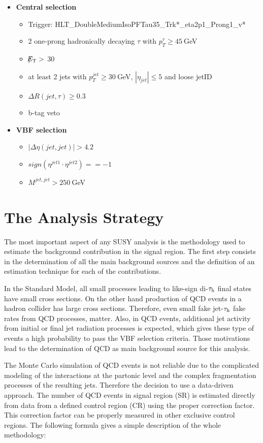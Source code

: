 \begin{itemize}
	\item \textbf{Central selection}
	\begin{itemize}
		\item Trigger: HLT\_DoubleMediumIsoPFTau35\_Trk*\_eta2p1\_Prong1\_v*
		\item 2 one-prong hadronically decaying $\tau$ with $p_{T}^{\tau}\geq45~$GeV 
		\item $\slash\mkern-12mu{E}_{\text{T}} > $ 30
		\item at least 2 jets with $p_{T}^{jet}\geq30~$GeV, $|\eta_{jet}|\leq5$ and loose jetID
		\item $\Delta R(jet,\tau)\geq0.3$
		\item b-tag veto
	\end{itemize}
	\item \textbf{VBF selection}
	\begin{itemize}
		\item $|\Delta\eta(jet,jet)| > 4.2$
		\item $sign(\eta^{jet 1}\cdot\eta^{jet 2})==-1$
		\item $M^{jet,jet}>250~$GeV
	\end{itemize}
\end{itemize}

\section{The Analysis Strategy}

The most important aspect of any SUSY analysis is the methodology used to estimate the background contribution in the signal region. The first step consists in the determination of all the main background sources and the definition of an estimation technique for each of the contributions. 

In the Standard Model, all small processes leading to like-sign di-$\tau_{\text{h}}$ final states have small cross sections. On the other hand production of QCD events in a hadron collider has large cross sections. Therefore, even small fake jet-$\tau_{\text{h}}$ fake rates from QCD processes, matter. Also, in QCD events, additional jet activity from initial or final jet radiation processes is expected, which gives these type of events a high probability to pass the VBF selection criteria. Those motivations lead to the determination of QCD as main background source for this analysis. 

The Monte Carlo simulation of QCD events is not reliable due to the complicated modeling of the interactions at the partonic level and the complex fragmentation processes of the resulting jets. Therefore the decision to use a data-driven approach. The number of QCD events in signal region (SR) is estimated directly from data from a defined control region (CR) using the proper correction factor. This correction factor can be properly measured in other exclusive control regions. The following formula gives a simple description of the whole methodology:

